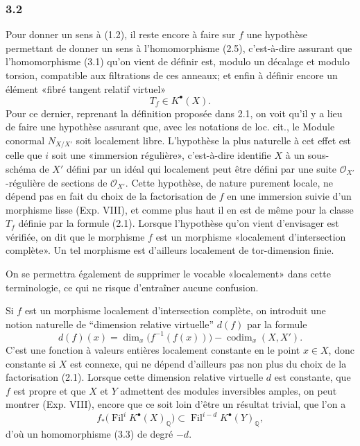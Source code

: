 \documentclass[11pt]{article}
\newcommand{\Fil}{\operatorname{Fil}}
\providecommand{\codim}{\operatorname{codim}}
\providecommand{\codim}{\operatorname{codim}}
\begin{document}
\subsubsection*{3.2}
Pour donner un sens à (1.2), il reste encore à faire sur $f$ une hypothèse permettant de donner un sens à l'homomorphisme (2.5), c'est-à-dire assurant que l'homomorphisme (3.1) qu'on vient de définir est, modulo un décalage et modulo torsion, compatible aux filtrations de ces anneaux; et enfin à définir encore un élément «fibré tangent relatif virtuel»
\[
T_f\in K^\bullet(X).
\]
Pour ce dernier, reprenant la définition proposée dans 2.1, on voit qu'il y a lieu de faire une hypothèse assurant que, avec les notations de loc. cit., le Module conormal $N_{X/X'}$ soit localement libre. L'hypothèse la plus naturelle à cet effet est celle que $i$ soit une «immersion régulière», c'est-à-dire identifie $X$ à un sous-schéma de $X'$ défini par un idéal qui localement peut être défini par une suite $\mathcal O_{X'}$-régulière de sections de $\mathcal O_{X'}$. Cette hypothèse, de nature purement locale, ne dépend pas en fait du choix de la factorisation de $f$ en une immersion suivie d'un morphisme lisse (Exp. VIII), et comme plus haut il en est de même pour la classe $T_f$ définie par la formule (2.1). Lorsque l'hypothèse qu'on vient d'envisager est vérifiée, on dit que le morphisme $f$ est un morphisme «localement d'intersection complète». Un tel morphisme est d'ailleurs localement de tor-dimension finie.

On se permettra également de supprimer le vocable «localement» dans cette terminologie, ce qui ne risque d'entraîner aucune confusion.

Si $f$ est un morphisme localement d'intersection compl\`ete, on introduit une notion naturelle de ``dimension relative virtuelle'' $d(f)$ par la formule
\[
d(f)(x)=\dim_x\bigl(f^{-1}(f(x))\bigr)-\codim_x(X,X').
\]
C'est une fonction \`a valeurs enti\`eres localement constante en le point $x\in X$, donc constante si $X$ est connexe, qui ne d\'epend d'ailleurs pas non plus du choix de la factorisation (2.1). Lorsque cette dimension relative virtuelle $d$ est constante, que $f$ est propre et que $X$ et $Y$ admettent des modules inversibles amples, on peut montrer (Exp. VIII), encore que ce soit loin d'\^etre un r\'esultat trivial, que l'on a
\begin{equation}\tag{3.4}
f_*\bigl(\Fil^iK^\bullet(X)_{\mathbb Q}\bigr)\subset \Fil^{i-d}K^\bullet(Y)_{\mathbb Q},
\end{equation}
d'o\`u un homomorphisme (3.3) de degr\'e $-d$.
\end{document}
